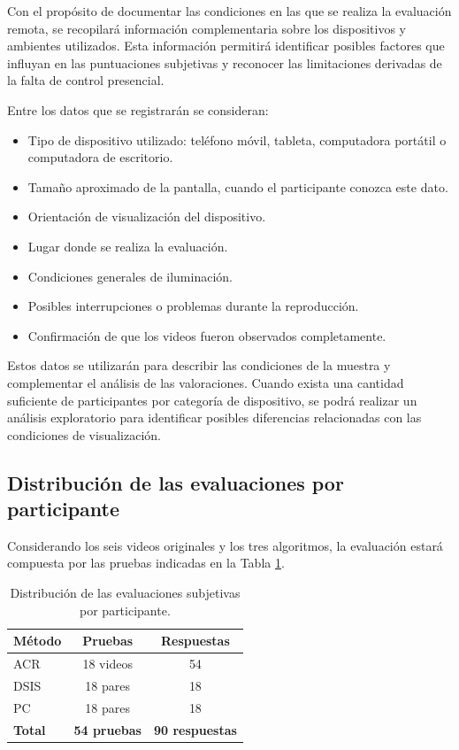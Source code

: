 Con el propósito de documentar las condiciones en las que se realiza la evaluación remota, se recopilará información complementaria sobre los dispositivos y ambientes utilizados. Esta información permitirá identificar posibles factores que influyan en las puntuaciones subjetivas y reconocer las limitaciones derivadas de la falta de control presencial.

Entre los datos que se registrarán se consideran:

\begin{itemize}
\item Tipo de dispositivo utilizado: teléfono móvil, tableta, computadora portátil o computadora de escritorio.
\item Tamaño aproximado de la pantalla, cuando el participante conozca este dato.
\item Orientación de visualización del dispositivo.
\item Lugar donde se realiza la evaluación.
\item Condiciones generales de iluminación.
\item Posibles interrupciones o problemas durante la reproducción.
\item Confirmación de que los videos fueron observados completamente.
\end{itemize}

Estos datos se utilizarán para describir las condiciones de la muestra y complementar el análisis de las valoraciones. Cuando exista una cantidad suficiente de participantes por categoría de dispositivo, se podrá realizar un análisis exploratorio para identificar posibles diferencias relacionadas con las condiciones de visualización.

\subsection{Distribución de las evaluaciones por participante}

Considerando los seis videos originales y los tres algoritmos, la evaluación estará compuesta por las pruebas indicadas en la Tabla \ref{tab:estructura_subjetiva}.

\begin{table}[H]
\centering
\caption{Distribución de las evaluaciones subjetivas por participante.}
\label{tab:estructura_subjetiva}
\begin{tabular}{|l|c|c|}
\hline
\textbf{Método} & \textbf{Pruebas} & \textbf{Respuestas} \\ \hline
ACR & 18 videos & 54 \\ \hline
DSIS & 18 pares & 18 \\ \hline
PC & 18 pares & 18 \\ \hline
\textbf{Total} & \textbf{54 pruebas} & \textbf{90 respuestas} \\ \hline
\end{tabular}
\end{table}

